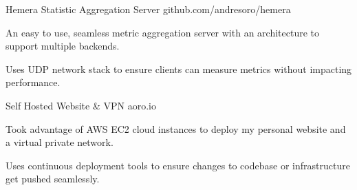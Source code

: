 

\begin{cventries}

  \cventry
    {Hemera} %
    {Statistic Aggregation Server} %
    {github.com/andresoro/hemera} %
    {} %
    {
      \begin{cvitems} %
        \item {An easy to use, seamless metric aggregation server with an architecture to support multiple backends.}
        \item {Uses UDP network stack to ensure clients can measure metrics without impacting performance.}
      \end{cvitems}
    }

  \cventry
    {} %
    {Self Hosted Website \& VPN} %
    {aoro.io} %
    {} %
    {
      \begin{cvitems} %
        \item {Took advantage of AWS EC2 cloud instances to deploy my personal website and a virtual private network.}
        \item {Uses continuous deployment tools to ensure changes to codebase or infrastructure get pushed seamlessly.}
      \end{cvitems}
    }

\end{cventries}
